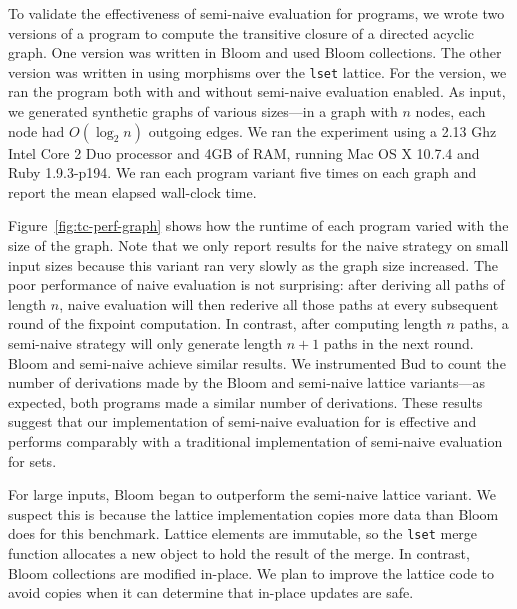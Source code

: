 To validate the effectiveness of semi-naive evaluation for \lang programs, we
wrote two versions of a program to compute the transitive closure of a directed
acyclic graph. One version was written in Bloom and used Bloom collections. The
other version was written in \lang using morphisms over the \texttt{lset}
lattice. For the \lang version, we ran the program both with and without
semi-naive evaluation enabled. As input, we generated synthetic graphs of
various sizes---in a graph with $n$ nodes, each node had $O(\log_2 n)$ outgoing
edges. We ran the experiment using a 2.13 Ghz Intel Core 2 Duo processor and 4GB
of RAM, running Mac OS X 10.7.4 and Ruby 1.9.3-p194. We ran each program variant
five times on each graph and report the mean elapsed wall-clock time.

Figure~\ref{fig:tc-perf-graph} shows how the runtime of each program varied with
the size of the graph. Note that we only report results for the naive \lang
strategy on small input sizes because this variant ran very slowly as the graph
size increased. The poor performance of naive evaluation is not surprising:
after deriving all paths of length $n$, naive evaluation will then rederive all
those paths at every subsequent round of the fixpoint computation. In contrast,
after computing length $n$ paths, a semi-naive strategy will only generate
length $n+1$ paths in the next round. Bloom and semi-naive \lang achieve similar
results. We instrumented Bud to count the number of derivations made by the
Bloom and semi-naive lattice variants---as expected, both programs made a
similar number of derivations. These results suggest that our implementation of
semi-naive evaluation for \lang is effective and performs comparably with
a traditional implementation of semi-naive evaluation for sets.

For large inputs, Bloom began to outperform the semi-naive lattice variant. We
suspect this is because the lattice implementation copies more data than Bloom
does for this benchmark. Lattice elements are immutable, so the \texttt{lset}
merge function allocates a new object to hold the result of the merge. In
contrast, Bloom collections are modified in-place. We plan to improve the
lattice code to avoid copies when it can determine that in-place updates are
safe.


